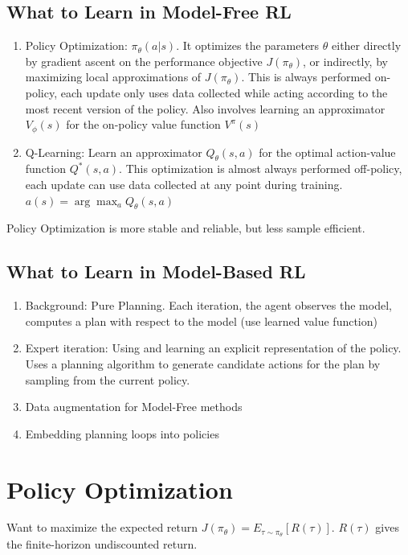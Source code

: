 \documentclass{article}
\begin{document}
  \subsection{What to Learn in Model-Free RL}
    \begin{enumerate}
      \item Policy Optimization: $\pi_\theta(a|s)$. It optimizes the parameters $\theta$ either directly by gradient ascent on the performance objective $J(\pi_{\theta})$, or indirectly, by maximizing local approximations of $J(\pi_{\theta})$. This is always performed on-policy, each update only uses data collected while acting according to the most recent version of the policy. Also involves learning an approximator $V_\phi(s)$ for the on-policy value function $V^\pi(s)$
      \item Q-Learning: Learn an approximator $Q_\theta(s, a)$ for the optimal action-value function $Q^*(s, a)$. This optimization is almost always performed off-policy, each update can use data collected at any point during training. $a(s) = \arg\max_a Q_\theta(s, a)$
    \end{enumerate}

    Policy Optimization is more stable and reliable, but less sample efficient.
  \subsection{What to Learn in Model-Based RL}
    \begin{enumerate}
      \item Background: Pure Planning. Each iteration, the agent observes the model, computes a plan with respect to the model (use learned value function)
      \item Expert iteration:  Using and learning an explicit representation of the policy. Uses a planning algorithm to generate candidate actions for the plan by sampling from the current policy.
      \item Data augmentation for Model-Free methods
      \item Embedding planning loops into policies
    \end{enumerate}
\section{Policy Optimization}
    Want to maximize the expected return $J(\pi_{\theta}) = E_{\tau \sim \pi_{\theta}}[R(\tau)]$. $R(\tau)$ gives the finite-horizon undiscounted return.
    
\end{document}
